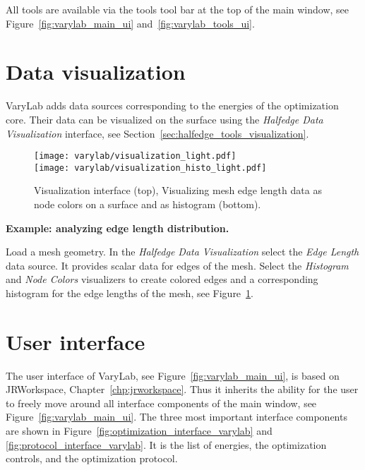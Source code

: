 \documentclass[Thesis.tex]{subfiles}
\begin{document}
All tools are available via the tools tool bar at the top of the main window, see Figure~\ref{fig:varylab_main_ui} and~\ref{fig:varylab_tools_ui}.

\section{Data visualization}

{\sc VaryLab} adds data sources corresponding to the energies of the optimization core. Their data can be visualized on the surface using the \emph{Halfedge Data Visualization} interface, see Section~\ref{sec:halfedge_tools_visualization}. 

\begin{figure}
    \begin{center}
    \texttt{[image: varylab/visualization\_light.pdf]}\\
    \vspace{1mm}
    \texttt{[image: varylab/visualization\_histo\_light.pdf]}    
    \caption{Visualization interface (top), Visualizing mesh edge length data as node colors on a surface and as histogram (bottom).}
    \label{fig:visualizing_edge_lengths}
    \end{center}
\end{figure}

{\bf Example: analyzing edge length distribution.}
\nopagebreak

Load a mesh geometry. In the \emph{Halfedge Data Visualization} select the \emph{Edge Length} data source. It provides scalar data for edges of the mesh. Select the \emph{Histogram} and \emph{Node Colors} visualizers to create colored edges and a corresponding histogram for the edge lengths of the mesh, see Figure~\ref{fig:visualizing_edge_lengths}.


\section{User interface}
\label{sec:ui_varylab}

The user interface of {\sc VaryLab}, see Figure~\ref{fig:varylab_main_ui}, is based on {\sc JRWorkspace}, Chapter~\ref{chp:jrworkspace}. Thus it inherits the ability for the user to freely move around all interface components of the main window, see Figure~\ref{fig:varylab_main_ui}. 
The three most important interface components are shown in Figure~\ref{fig:optimization_interface_varylab} and \ref{fig:protocol_interface_varylab}. It is the list of energies, the optimization controls, and the optimization protocol.
\end{document}
